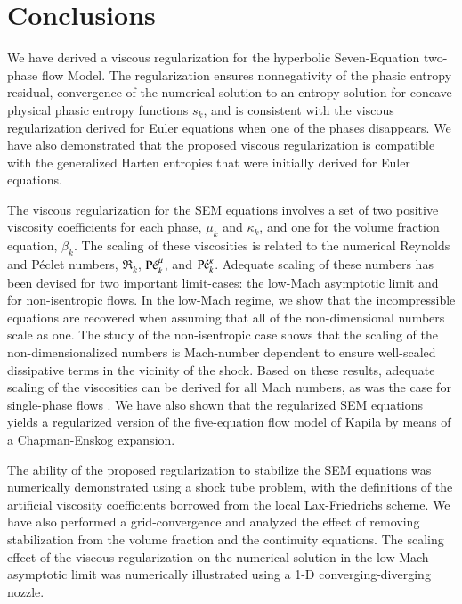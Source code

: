 \section{Conclusions}\label{sec:conclusion}
%
We have derived a viscous regularization for the hyperbolic Seven-Equation two-phase flow Model. The regularization ensures nonnegativity of the phasic entropy residual, 
convergence of the numerical solution to an entropy solution for concave physical phasic entropy functions $s_k$, and is consistent with the viscous regularization derived for 
Euler equations when one of the phases disappears. 
We have also demonstrated that the proposed viscous regularization is compatible with the generalized Harten entropies that were initially derived for Euler equations. 

The viscous regularization for the SEM equations involves a set of two positive viscosity coefficients for each phase, $\mu_k$ and $\kappa_k$, and one for the volume 
fraction equation, $\beta_k$. The scaling of these viscosities is related to the numerical Reynolds and P\'eclet numbers, $\Re_k$, $\textrm{P\'e}_k^\mu$, and $\textrm{P\'e}_k^\kappa$. 
Adequate scaling of these numbers has been devised for two important limit-cases: the low-Mach asymptotic limit and for non-isentropic flows. In the low-Mach regime, 
we show that the incompressible equations are recovered when assuming that all of the non-dimensional numbers scale as one. The study of the non-isentropic case 
shows that the scaling of the non-dimensionalized numbers is Mach-number dependent to ensure well-scaled dissipative terms in the vicinity of the shock.
Based on these results, adequate scaling of the viscosities can be derived for all Mach numbers, as was the case for single-phase flows \cite{Marco_paper_low_mach}. 
%
We have also shown that the regularized SEM equations yields a regularized version of the five-equation flow model of Kapila by means of a Chapman-Enskog expansion.

The ability of the proposed regularization to stabilize the SEM equations was numerically demonstrated using a shock tube problem, with the definitions of the 
artificial viscosity coefficients borrowed from the local Lax-Friedrichs scheme. We have also performed a grid-convergence and analyzed the effect of removing stabilization from the volume fraction 
and the continuity equations. The scaling effect of the viscous regularization on the numerical solution in the low-Mach asymptotic limit was numerically illustrated using a 1-D converging-diverging nozzle.

